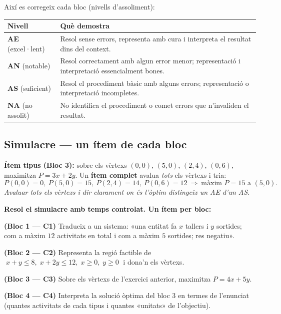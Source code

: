 \noindent Així es corregeix cada bloc (nivells d'assoliment):
\begin{center}
\renewcommand{\arraystretch}{1.3}
\begin{tabular}{p{2.4cm} p{10.2cm}}
\toprule
\textbf{Nivell} & \textbf{Què demostra} \\
\midrule
\textbf{AE} (excel·lent) & Resol sense errors, representa amb cura i interpreta el
resultat dins del context. \\
\textbf{AN} (notable) & Resol correctament amb algun error menor; representació i
interpretació essencialment bones. \\
\textbf{AS} (suficient) & Resol el procediment bàsic amb alguns errors; representació
o interpretació incompletes. \\
\textbf{NA} (no assolit) & No identifica el procediment o comet errors que
n'invaliden el resultat. \\
\bottomrule
\end{tabular}
\end{center}

\subsection{Simulacre — un ítem de cada bloc}

\begin{exemple}
\textbf{Ítem tipus (Bloc 3):} sobre els vèrtexs $(0,0)$, $(5,0)$, $(2,4)$, $(0,6)$,
maximitza $P=3x+2y$. Un \textbf{ítem complet} avalua \emph{tots} els vèrtexs i tria:
\[
P(0,0)=0,\ P(5,0)=15,\ P(2,4)=14,\ P(0,6)=12 \ \Rightarrow\ \text{màxim } P=15 \text{ a } (5,0).
\]
\emph{Avaluar tots els vèrtexs i dir clarament on és l'òptim distingeix un AE d'un AS.}
\end{exemple}

\begin{exercicis}
\textbf{Resol el simulacre amb temps controlat. Un ítem per bloc:}
\begin{exlist}
  \item \textbf{(Bloc 1 — C1)} Tradueix a un sistema: «una entitat fa $x$ tallers i $y$
        sortides; com a màxim $12$ activitats en total i com a màxim $5$ sortides; res
        negatiu».
  \item \textbf{(Bloc 2 — C2)} Representa la regió factible de
        $\;x+y\le 8,\;x+2y\le 12,\;x\ge 0,\;y\ge 0\;$ i dona'n els vèrtexs.
  \item \textbf{(Bloc 3 — C3)} Sobre els vèrtexs de l'exercici anterior, maximitza
        $P=4x+5y$.
  \item \textbf{(Bloc 4 — C4)} Interpreta la solució òptima del bloc 3 en termes de
        l'enunciat (quantes activitats de cada tipus i quantes «unitats» de l'objectiu).
\end{exlist}
\end{exercicis}

